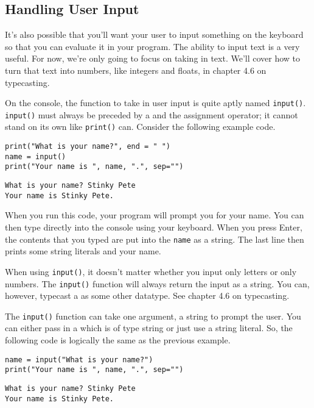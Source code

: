 \subsection{Handling User Input}
It's also possible that you'll want your user to input something on the keyboard so that you can evaluate it in your program. The ability to input text is a very useful. For now, we're only going to focus on taking in text. We'll cover how to turn that text into numbers, like integers and floats, in chapter 4.6 on typecasting.\par
On the console, the function to take in user input is quite aptly named \verb|input()|. \verb|input()| must always be preceded by a  and the  assignment operator; it cannot stand on its own like \verb|print()| can. Consider the following example code.\par
\begin{lstlisting}[style=pippython]
print("What is your name?", end = " ")
name = input()
print("Your name is ", name, ".", sep="")
\end{lstlisting}
\begin{lstlisting}
What is your name? Stinky Pete
Your name is Stinky Pete.
\end{lstlisting}
When you run this code, your program will prompt you for your name. You can then type directly into the console using your keyboard. When you press Enter, the contents that you typed are put into the  \verb|name| as a string. The last line then prints some string literals and your name.\par
When using \verb|input()|, it doesn't matter whether you input only letters or only numbers. The \verb|input()| function will always return the input as a string. You can, however, typecast a  as some other datatype. See chapter 4.6 on typecasting.\par
The \verb|input()| function can take one argument, a string to prompt the user. You can either pass in a  which is of type string or just use a string literal. So, the following code is logically the same as the previous example.\par
\begin{lstlisting}[style=pippython]
name = input("What is your name?")
print("Your name is ", name, ".", sep="")
\end{lstlisting}
\begin{lstlisting}
What is your name? Stinky Pete
Your name is Stinky Pete.
\end{lstlisting}
